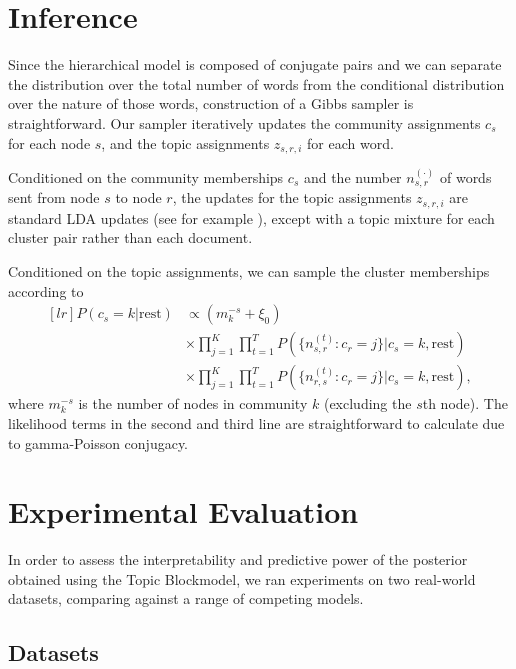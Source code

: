 \section{Inference}\label{sec:inference}

    Since the hierarchical model is composed of conjugate pairs and we can separate the distribution over the total number of words from the conditional distribution over the nature of those words, construction of a Gibbs sampler is straightforward. Our sampler iteratively updates the community assignments $c_s$ for each node $s$, and the topic assignments $z_{s,r,i}$ for each word.
    
    Conditioned on the community memberships $c_s$ and the number $n_{s,r}^{(\cdot)}$ of words sent from node $s$ to node $r$,  the updates for the topic assignments $z_{s,r,i}$ are standard LDA updates (see for example \citep{griffiths2004finding}), except with a topic mixture for each cluster pair rather than each document. 
    
    Conditioned on the topic assignments, we can sample the cluster memberships according to
    \begin{equation}
    \begin{aligned}[l r] P(c_s=k|\mbox{rest}) & \propto (m_k^{-s}+\xi_0) \\ & \times \prod_{j=1}^K \prod_{t=1}^T P(\{n_{s,r}^{(t)}: c_r=j\}|c_s=k, \mbox{rest}) \\ & \times \prod_{j=1}^K \prod_{t=1}^T  P(\{n_{r,s}^{(t)}:c_r=j\}|c_s=k, \mbox{rest}), \end{aligned}
    \end{equation}
    where $m_k^{-s}$ is the number of nodes in community $k$ (excluding the $s$th node). The likelihood terms in the second and third line are straightforward to calculate due to gamma-Poisson conjugacy. 

\section{Experimental Evaluation}\label{sec:results}

    In order to assess the interpretability and predictive power of the posterior obtained using the Topic Blockmodel, we ran experiments on two real-world datasets, comparing against a range of competing models. 
    
    \subsection{Datasets}\label{sec:datasets}
    
